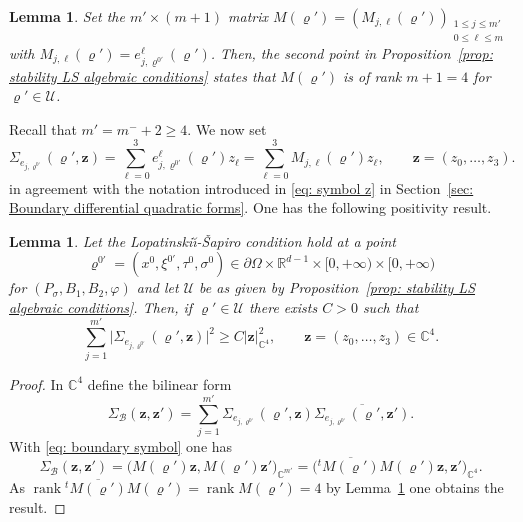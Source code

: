 \documentclass[10pt]{amsart}
\theoremstyle{plain}
\newtheorem{lemma}[theorem]{Lemma}
\theoremstyle{definition}
\def\R{\mathbb{R}}
\def\C{\mathbb{C}}
\newcommand{\LS}{Lopatinski\u{\i}-\v{S}apiro\xspace}
\let\y\varrho
\newcommand{\ovl}[1]{\overline{#1}}
\newcommand{\biginp}[2]{\big(#1, #2 \big)}
\newcommand{\un}[1]{\Sigma_{#1}}
\newcommand{\U}{\mathscr U}
\newcommand{\z}{\boldsymbol{z}}
\newcommand{\transp}{\ensuremath{\phantom{}^{t}}}
\newcommand{\Psig}{P_{\sigma}}
\DeclareMathOperator{\rank}{rank}
\begin{document}
\begin{lemma}
\label{lemma: algebraic condition LS}
Set the $m' \times (m+1) $ matrix $M (\y') = (M_{j, \ell} (\y'))_{\substack{1\leq j \leq m'\\0\leq \ell \leq m}}$ with $M_{j, \ell} (\y') = e_{j, \y^{0\prime}}^\ell (\y')$. Then, the second point
in Proposition~\ref{prop: stability LS algebraic conditions} states
that $M (\y') $ is of rank \hbox{$m+1=4$} for $\y ' \in \U$.
\end{lemma}
Recall that $m' = m^- + 2 \geq 4$.
We now set
\begin{equation}
\label{eq: boundary symbol}
\un{e_{j, \y^{0\prime}}} (\y', \z) = \sum_{\ell=0}^{3} e_{j,
\y^{0\prime}}^\ell (\y') z_\ell = \sum_{\ell=0}^{3} M_{j, \ell}
(\y') z_\ell , \qquad \z = (z_0, \dots, z_3).
\end{equation}
in agreement with the notation introduced in \eqref{eq: symbol z} in Section~\ref{sec: Boundary differential quadratic forms}.
One has the following positivity result.

\begin{lemma}
\label{lemma: postivity boundary form}
Let the \LS condition hold at a point
\[
\y^{0\prime} = (x^0, \xi^{0\prime}, \tau^0, \sigma^0)\in \partial
\Omega \times \R^{d-1}\times [0,+\infty) \times [0,+\infty)
\]
for
$(\Psig, B_1, B_2, \varphi)$ and let $\U$ be as given by
Proposition~\ref{prop: stability LS algebraic conditions}.
Then, if $\y' \in \U$ there exists $C>0$ such that
\begin{equation*}
\sum_{j=1}^{m'} \big|\un{e_{j, \y^{0\prime}}} (\y', \z)\big|^2 \geq
C |\z|_{\C^{4}}^2,
\qquad \z = (z_0, \dots, z_3) \in \C^{4}.
\end{equation*}
\end{lemma}
\begin{proof}
In $\C^4$ define the bilinear form
\begin{equation*}
\Sigma_{\mathscr B} (\z, \z')
= \sum_{j=1}^{m'} \un{e_{j,\y^{0\prime}}} (\y', \z)
\ovl{\un{e_{j,\y^{0\prime}}} (\y', \z')}.
\end{equation*}
With \eqref{eq: boundary symbol} one has
\begin{equation*}
\Sigma_{\mathscr B} (\z, \z')
= \biginp{M (\y') \z}{M (\y') \z'}_{\C^{m'}}
= \biginp{\transp \ovl{M (\y')} M (\y') \z}{\z'}_{\C^{4}}.
\end{equation*}
As $\rank \transp \ovl{M (\y')} M (\y') = \rank M (\y') =4$ by
Lemma~\ref{lemma: algebraic condition LS} one obtains
the result.
\end{proof}
\end{document}
